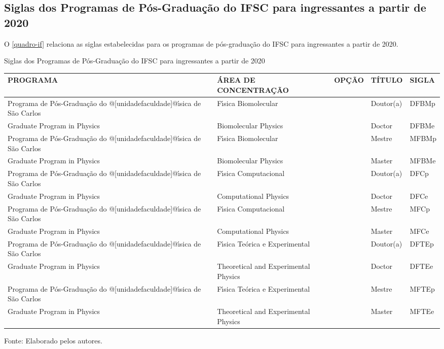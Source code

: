 \begin{apendicesenv}
\chapter{Siglas dos Programas de P\'os-Gradua\c{c}\~ao do IFSC para ingressantes a partir de 2020}
O \autoref{quadro-if} relaciona as siglas estabelecidas para os programas de p\'os-gradua\c{c}\~ao do IFSC para ingressantes a partir de 2020.
\begin{quadro}[Htb] 
	\ABNTEXfontereduzida
	\caption[Siglas dos Programas de P\'os-Gradua\c{c}\~ao do IFSC para ingressantes a partir de 2020]{Siglas dos Programas de P\'os-Gradua\c{c}\~ao do IFSC para ingressantes a partir de 2020}
	\label{quadro-if}
	\begin{tabular}{|p{4.5cm}|p{4.0cm}|p{2.0cm}|p{1.5cm}|p{2.25cm}|}
		\hline
		\textbf{PROGRAMA} & \textbf{\'AREA DE CONCENTRA\c{C}\~AO} & \textbf{OP\c{C}\~AO} & \textbf{T\'ITULO} & \textbf{SIGLA}  \\
		\hline
		Programa de P\'os-Gradua\c{c}\~ao do @[unidadefaculdade]@\'{\i}sica de S\~ao Carlos & F\'{\i}sica Biomolecular &  & Doutor(a) & DFBMp\\
		Graduate Program in Physics & Biomolecular Physics &  & Doctor & DFBMe\\
		Programa de P\'os-Gradua\c{c}\~ao do @[unidadefaculdade]@\'{\i}sica de S\~ao Carlos & F\'{\i}sica Biomolecular &  & Mestre & MFBMp\\		
		Graduate Program in Physics & Biomolecular Physics &  & Master & MFBMe\\
		Programa de P\'os-Gradua\c{c}\~ao do @[unidadefaculdade]@\'{\i}sica de S\~ao Carlos & F\'{\i}sica Computacional &  & Doutor(a) & DFCp\\
		Graduate Program in Physics & Computational Physics &  & Doctor & DFCe\\
		Programa de P\'os-Gradua\c{c}\~ao do @[unidadefaculdade]@\'{\i}sica de S\~ao Carlos & F\'{\i}sica Computacional &  & Mestre & MFCp\\		
		Graduate Program in Physics & Computational Physics &  & Master & MFCe\\
		Programa de P\'os-Gradua\c{c}\~ao do @[unidadefaculdade]@\'{\i}sica de S\~ao Carlos & F\'{\i}sica Te\'orica e Experimental &  & Doutor(a) & DFTEp\\		
		Graduate Program in Physics & Theoretical and Experimental Physics &  & Doctor & DFTEe\\
		Programa de P\'os-Gradua\c{c}\~ao do @[unidadefaculdade]@\'{\i}sica de S\~ao Carlos & F\'{\i}sica Te\'orica e Experimental &  & Mestre & MFTEp\\
		Graduate Program in Physics & Theoretical and Experimental Physics &  & Master & MFTEe\\
		\hline
	\end{tabular}
	\begin{flushleft}
		Fonte: Elaborado pelos autores.\
	\end{flushleft}
\end{quadro}


\end{apendicesenv}
